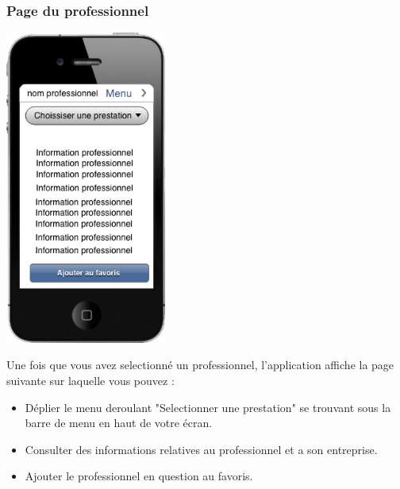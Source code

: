 \documentclass{article}
\begin{document}
\subsubsection{Page du professionnel}
\begin{center}
  \includegraphics[width=150pt]{Interfaces/professionnel}
\end{center}
Une fois que vous avez selectionné un professionnel, l'application affiche la page suivante sur laquelle vous pouvez :

\begin{itemize}
  \item Déplier le menu deroulant "Selectionner une prestation" se trouvant sous la barre de menu en haut de votre écran.
  \item Consulter des informations relatives au professionnel et a son entreprise.
  \item Ajouter le professionnel en question au favoris.
\end{itemize}
\end{document}
